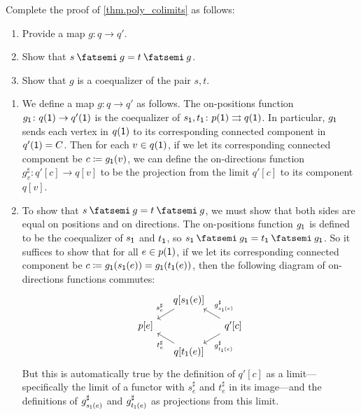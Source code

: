 \documentclass[Book-Poly]{subfiles}
\begin{document}
\begin{exercise}\label{exc.poly_colimits}
Complete the proof of \cref{thm.poly_colimits} as follows:
\begin{enumerate}
	\item Provide a map $g \colon q \to q'$.
	\item Show that $s \then g = t \then g$.
	\item Show that $g$ is a coequalizer of the pair $s, t$.
\qedhere
\end{enumerate}
\begin{solution}
\begin{enumerate}
    \item We define a map $g \colon q \to q'$ as follows.
    The on-positions function $g_{\textsf{1}} \colon q(\textsf{1}) \to q'(\textsf{1})$ is the coequalizer of $s_{\textsf{1}}, t_{\textsf{1}} \colon p(\textsf{1}) \rightrightarrows q(\textsf{1})$.
    In particular, $g_{\textsf{1}}$ sends each vertex in $q(\textsf{1})$ to its corresponding connected component in $q'(\textsf{1}) = C$.
    Then for each $v \in q(\textsf{1})$, if we let its corresponding connected component be $c \coloneqq g_{\textsf{1}}(v)$, we can define the on-directions function $g^\sharp_v \colon q'[c] \to q[v]$ to be the projection from the limit $q'[c]$ to its component $q[v]$.
    
    \item To show that $s \then g = t \then g$, we must show that both sides are equal on positions and on directions.
    The on-positions function $g_{\textsf{1}}$ is defined to be the coequalizer of $s_{\textsf{1}}$ and $t_{\textsf{1}}$, so $s_\1 \then g_\1 = t_\1 \then g_\1$.
    So it suffices to show that for all $e \in p(\textsf{1})$, if we let its corresponding connected component be $c \coloneqq g_{\textsf{1}}(s_{\textsf{1}}(e)) = g_{\textsf{1}}(t_{\textsf{1}}(e))$, then the following diagram of on-directions functions commutes:
    \[
    \begin{tikzcd}[sep=small]
        & q[s_\1(e)] \ar[dl, "s^\sharp_e"'] \\
        p[e] & & q'[c] \ar[ul, "g^\sharp_{s_\1(e)}"'] \ar[dl, "g^\sharp_{t_\1(e)}"] \\
        & q[t_\1(e)] \ar[ul, "t^\sharp_e"]
    \end{tikzcd}
    \]
    But this is automatically true by the definition of $q'[c]$ as a limit---specifically the limit of a functor with $s^\sharp_e$ and $t^\sharp_e$ in its image---and the definitions of $g^\sharp_{s_{\textsf{1}}(e)}$ and $g^\sharp_{t_{\textsf{1}}(e)}$ as projections from this limit.
    

\end{enumerate}
\end{solution}
\end{exercise}
\end{document}
